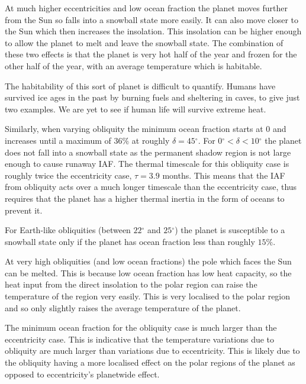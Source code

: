 \documentclass[12pt, onecolumn]{revtex4-2}    %
\newcommand{\degrees}{\ensuremath{^{\circ}}}
\begin{document}
At much higher eccentricities and low ocean fraction the planet moves further from the Sun so falls into a snowball state more easily.
It can also move closer to the Sun which then increases the insolation.
This insolation can be higher enough to allow the planet to melt and leave the snowball state.
The combination of these two effects is that the planet is very hot half of the year and frozen for the other half of the year, with an average temperature which is habitable.

The habitability of this sort of planet is difficult to quantify.
Humans have survived ice ages in the past by burning fuels and sheltering in caves, to give just two examples.
We are yet to see if human life will survive extreme heat.

Similarly, when varying obliquity the minimum ocean fraction starts at $0$ and increases until a maximum of $36\%$ at roughly $\delta = 45\degrees$.
For $0\degrees < \delta < 10\degrees$ the planet does not fall into a snowball state as the permanent shadow region is not large enough to cause runaway IAF.
The thermal timescale for this obliquity case is roughly twice the eccentricity case, $\tau = 3.9$ months.
This means that the IAF from obliquity acts over a much longer timescale than the eccentricity case, thus requires that the planet has a higher thermal inertia in the form of oceans to prevent it.

For Earth-like obliquities (between $22\degrees$ and $25\degrees$) the planet is susceptible to a snowball state only if the planet has ocean fraction less than roughly $15\%$.

At very high obliquities (and low ocean fractions) the pole which faces the Sun can be melted.
This is because low ocean fraction has low heat capacity, so the heat input from the direct insolation to the polar region can raise the temperature of the region very easily.
This is very localised to the polar region and so only slightly raises the average temperature of the planet.

The minimum ocean fraction for the obliquity case is much larger than the eccentricity case.
This is indicative that the temperature variations due to obliquity are much larger than variations due to eccentricity.
This is likely due to the obliquity having a more localised effect on the polar regions of the planet as opposed to eccentricity's planetwide effect.
\end{document}
